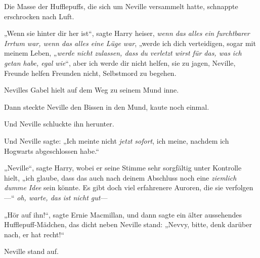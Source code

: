 Die Masse der Hufflepuffs, die sich um Neville versammelt hatte, schnappte erschrocken nach Luft.

„Wenn sie hinter dir her ist“, sagte Harry heiser, \emph{wenn das alles ein furchtbarer Irrtum war, wenn das alles eine Lüge war}, „werde ich dich verteidigen, sogar mit meinem Leben, „\emph{werde nicht zulassen, dass du verletzt wirst für das, was ich getan habe, egal wie}“, aber ich werde dir nicht helfen, sie zu jagen, Neville, Freunde helfen Freunden nicht, Selbstmord zu begehen.

Nevilles Gabel hielt auf dem Weg zu seinem Mund inne.

Dann steckte Neville den Bissen in den Mund, kaute noch einmal.

Und Neville schluckte ihn herunter.

Und Neville sagte: „Ich meinte nicht \emph{jetzt sofort}, ich meine, nachdem ich Hogwarts abgeschlossen habe.“

„Neville“, sagte Harry, wobei er seine Stimme sehr sorgfältig unter Kontrolle hielt, „ich glaube, dass das auch nach deinem Abschluss noch eine \emph{ziemlich dumme} \emph{Idee} sein könnte. Es gibt doch viel erfahrenere Auroren, die sie verfolgen—“ \emph{oh, warte, das ist nicht gut}—

„Hör auf ihn!“, sagte Ernie Macmillan, und dann sagte ein älter aussehendes Hufflepuff-Mädchen, das dicht neben Neville stand: „Nevvy, bitte, denk darüber nach, er hat recht!“

Neville stand auf.

